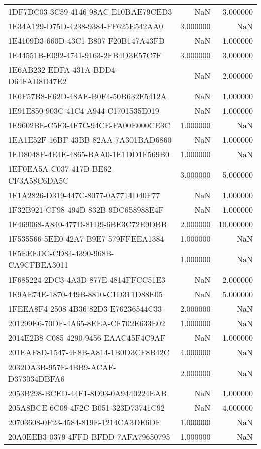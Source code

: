 \begin{tabular}{lrr}
1DF7DC03-3C59-4146-98AC-E10BAE79CED3 & NaN & 3.000000 \\
1E34A129-D75D-4238-9384-FF625E542AA0 & 3.000000 & NaN \\
1E4109D3-660D-43C1-B807-F20B147A43FD & NaN & 1.000000 \\
1E44551B-E092-4741-9163-2FB4D3E57C7F & 3.000000 & 3.000000 \\
1E6AB232-EDFA-431A-BDD4-D64FAD8D47E2 & NaN & 2.000000 \\
1E6F57B8-F62D-48AE-B0F4-50B632E5412A & NaN & 1.000000 \\
1E91E850-903C-41C4-A944-C1701535E019 & NaN & 1.000000 \\
1E9602BE-C5F3-4F7C-94CE-FA00E000CE3C & 1.000000 & NaN \\
1EA1E52F-16BF-43BB-82AA-7A301BAD6860 & NaN & 1.000000 \\
1ED8048F-4E4E-4865-BAA0-1E1DD1F569B0 & 1.000000 & NaN \\
1EF0EA5A-C037-417D-BE62-CF3A58C6DA5C & 3.000000 & 5.000000 \\
1F1A2826-D319-447C-8077-0A7714D40F77 & NaN & 1.000000 \\
1F32B921-CF98-494D-832B-9DC658988E4F & NaN & 1.000000 \\
1F469068-A840-477D-81D9-6BE3C72E9DBB & 2.000000 & 10.000000 \\
1F535566-5EE0-42A7-B9E7-579FFEEA1384 & 1.000000 & NaN \\
1F5EEEDC-CD84-4390-968B-CA9CFBEA3011 & 1.000000 & NaN \\
1F685224-2DC3-4A3D-877E-4814FFCC51E3 & NaN & 2.000000 \\
1F9AE74E-1870-449B-8810-C1D311D88E05 & NaN & 5.000000 \\
1FEEA8F4-2508-4B36-82D3-E76236544C33 & 2.000000 & NaN \\
201299E6-70DF-4A65-8EEA-CF702E633E02 & 1.000000 & NaN \\
2014E2B8-C085-4290-9456-EAAC45F4C9AF & NaN & 1.000000 \\
201EAF8D-1547-4F8B-A814-1B0D3CF8B42C & 4.000000 & NaN \\
2032DA3B-957E-4BB9-ACAF-D373034DBFA6 & 2.000000 & NaN \\
2053B298-BCED-44F1-8D93-0A9440224EAB & NaN & 1.000000 \\
205A8BCE-6C09-4F2C-B051-323D73741C92 & NaN & 4.000000 \\
20703608-0F23-4584-819E-1214CA3DE6DF & 1.000000 & NaN \\
20A0EEB3-0379-4FFD-BFDD-7AFA79650795 & 1.000000 & NaN \\

\end{tabular}
